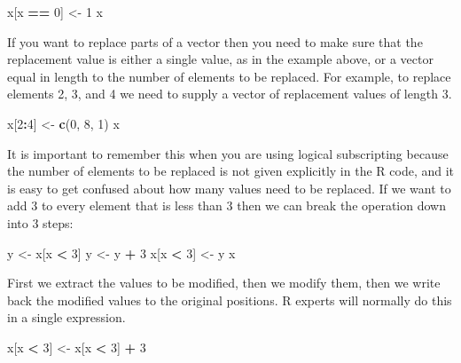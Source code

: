 \documentclass[
]{book}
\newenvironment{Shaded}{\begin{snugshade}}{\end{snugshade}}
\newcommand{\DecValTok}[1]{\textcolor[rgb]{0.00,0.00,0.81}{#1}}
\newcommand{\FunctionTok}[1]{\textcolor[rgb]{0.13,0.29,0.53}{\textbf{#1}}}
\newcommand{\NormalTok}[1]{#1}
\newcommand{\OtherTok}[1]{\textcolor[rgb]{0.56,0.35,0.01}{#1}}
\newcommand{\SpecialCharTok}[1]{\textcolor[rgb]{0.81,0.36,0.00}{\textbf{#1}}}
\begin{document}
\begin{Shaded}
\begin{Highlighting}[]
\NormalTok{x[x }\SpecialCharTok{==} \DecValTok{0}\NormalTok{] }\OtherTok{\textless{}{-}} \DecValTok{1}
\NormalTok{x}
\end{Highlighting}
\end{Shaded}

If you want to replace parts of a vector then you need to make sure
that the replacement value is either a single value, as in the example
above, or a vector equal in length to the number of elements to be
replaced. For example, to replace elements 2, 3, and 4 we need to
supply a vector of replacement values of length 3.

\begin{Shaded}
\begin{Highlighting}[]
\NormalTok{x[}\DecValTok{2}\SpecialCharTok{:}\DecValTok{4}\NormalTok{] }\OtherTok{\textless{}{-}} \FunctionTok{c}\NormalTok{(}\DecValTok{0}\NormalTok{, }\DecValTok{8}\NormalTok{, }\DecValTok{1}\NormalTok{)}
\NormalTok{x}
\end{Highlighting}
\end{Shaded}

It is important to remember this when you are using logical
subscripting because the number of elements to be replaced is not
given explicitly in the R code, and it is easy to get confused about
how many values need to be replaced. If we want to add 3 to every
element that is less than 3 then we can break the operation down into
3 steps:

\begin{Shaded}
\begin{Highlighting}[]
\NormalTok{y }\OtherTok{\textless{}{-}}\NormalTok{ x[x }\SpecialCharTok{\textless{}} \DecValTok{3}\NormalTok{]}
\NormalTok{y }\OtherTok{\textless{}{-}}\NormalTok{ y }\SpecialCharTok{+} \DecValTok{3}
\NormalTok{x[x }\SpecialCharTok{\textless{}} \DecValTok{3}\NormalTok{] }\OtherTok{\textless{}{-}}\NormalTok{ y}
\NormalTok{x}
\end{Highlighting}
\end{Shaded}

First we extract the values to be modified, then we modify them, then we
write back the modified values to the original positions. R experts will
normally do this in a single expression.

\begin{Shaded}
\begin{Highlighting}[]
\NormalTok{x[x }\SpecialCharTok{\textless{}} \DecValTok{3}\NormalTok{] }\OtherTok{\textless{}{-}}\NormalTok{ x[x }\SpecialCharTok{\textless{}} \DecValTok{3}\NormalTok{] }\SpecialCharTok{+} \DecValTok{3}
\end{Highlighting}
\end{Shaded}
\end{document}
